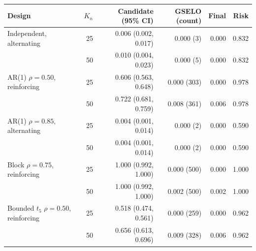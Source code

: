 \begin{tabular}{lrrrrr}
\toprule
Design & \(K_n\) & Candidate (95\% CI) & GSELO (count) & Final & Risk\\
\midrule
Independent, alternating & 25 & 0.006 (0.002, 0.017) & 0.000 (3) & 0.000 & 0.832\\
 & 50 & 0.010 (0.004, 0.023) & 0.000 (5) & 0.000 & 0.832\\
AR(1) \(\rho=0.50\), reinforcing & 25 & 0.606 (0.563, 0.648) & 0.000 (303) & 0.000 & 0.978\\
 & 50 & 0.722 (0.681, 0.759) & 0.008 (361) & 0.006 & 0.978\\
AR(1) \(\rho=0.85\), alternating & 25 & 0.004 (0.001, 0.014) & 0.000 (2) & 0.000 & 0.590\\
 & 50 & 0.004 (0.001, 0.014) & 0.000 (2) & 0.000 & 0.590\\
Block \(\rho=0.75\), reinforcing & 25 & 1.000 (0.992, 1.000) & 0.000 (500) & 0.000 & 1.000\\
 & 50 & 1.000 (0.992, 1.000) & 0.002 (500) & 0.002 & 1.000\\
Bounded \(t_5\) \(\rho=0.50\), reinforcing & 25 & 0.518 (0.474, 0.561) & 0.000 (259) & 0.000 & 0.962\\
 & 50 & 0.656 (0.613, 0.696) & 0.009 (328) & 0.006 & 0.962\\
\bottomrule
\end{tabular}
